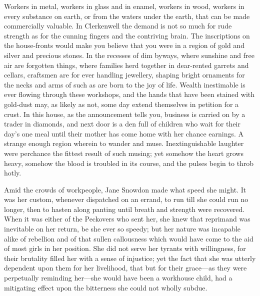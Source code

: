 {}Workers in metal, workers in glass and in enamel, workers in wood,
workers in every substance on earth, or from the waters under the earth,
that can be made commercially valuable. In Clerkenwell the demand is not
so much for rude strength as for the cunning fingers and the contriving
brain. The inscriptions on the house-fronts would make you believe that
you were in a region of gold and silver and precious stones. In the
recesses of dim byways, where sunshine and free air are forgotten
things, where families herd together in dear-rented garrets and cellars,
craftsmen are for ever handling jewellery, shaping bright ornaments for
the necks and arms of such as are born to the joy of life. Wealth
inestimable is ever flowing through these workshops, and the hands that
have been stained with gold-dust may, as likely as not, some day extend
themselves in petition for a crust. In this house, as the announcement
tells you, business is carried on by a trader in diamonds, and next door
is a den full of children who wait for their day's one meal {}until
their mother has come home with her chance earnings. A strange enough
region wherein to wander and muse. Inextinguishable laughter were
perchance the fittest result of such musing; yet somehow the heart grows
heavy, somehow the blood is troubled in its course, and the pulses begin
to throb hotly.

Amid the crowds of workpeople, Jane Snowdon made what speed she might.
It was her custom, whenever dispatched on an errand, to run till she
could run no longer, then to hasten along panting until breath and
strength were recovered. When it was either of the Peckovers who sent
her, she knew that reprimand was inevitable on her return, be she ever
so speedy; but her nature was incapable alike of rebellion and of that
sullen callousness which would have come to the aid of most girls in her
position. She did not serve her tyrants with willingness, for their
brutality filled her with a sense of injustice; yet the fact that she
was utterly dependent upon them for her livelihood, {}that but for their
grace---as they were perpetually reminding her---she would have been a
workhouse child, had a mitigating effect upon the bitterness she could
not wholly subdue.

